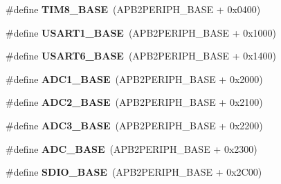 \begin{DoxyCompactItemize}
\item 
\hypertarget{group___peripheral__memory__map_ga5b72f698b7a048a6f9fcfe2efe5bc1db}{\#define {\bfseries T\-I\-M8\-\_\-\-B\-A\-S\-E}~(A\-P\-B2\-P\-E\-R\-I\-P\-H\-\_\-\-B\-A\-S\-E + 0x0400)}\label{group___peripheral__memory__map_ga5b72f698b7a048a6f9fcfe2efe5bc1db}

\item 
\hypertarget{group___peripheral__memory__map_ga86162ab3f740db9026c1320d46938b4d}{\#define {\bfseries U\-S\-A\-R\-T1\-\_\-\-B\-A\-S\-E}~(A\-P\-B2\-P\-E\-R\-I\-P\-H\-\_\-\-B\-A\-S\-E + 0x1000)}\label{group___peripheral__memory__map_ga86162ab3f740db9026c1320d46938b4d}

\item 
\hypertarget{group___peripheral__memory__map_gade4d3907fd0387ee832f426f52d568bb}{\#define {\bfseries U\-S\-A\-R\-T6\-\_\-\-B\-A\-S\-E}~(A\-P\-B2\-P\-E\-R\-I\-P\-H\-\_\-\-B\-A\-S\-E + 0x1400)}\label{group___peripheral__memory__map_gade4d3907fd0387ee832f426f52d568bb}

\item 
\hypertarget{group___peripheral__memory__map_ga695c9a2f892363a1c942405c8d351b91}{\#define {\bfseries A\-D\-C1\-\_\-\-B\-A\-S\-E}~(A\-P\-B2\-P\-E\-R\-I\-P\-H\-\_\-\-B\-A\-S\-E + 0x2000)}\label{group___peripheral__memory__map_ga695c9a2f892363a1c942405c8d351b91}

\item 
\hypertarget{group___peripheral__memory__map_ga6544abc57f9759f610eee09a02442ae6}{\#define {\bfseries A\-D\-C2\-\_\-\-B\-A\-S\-E}~(A\-P\-B2\-P\-E\-R\-I\-P\-H\-\_\-\-B\-A\-S\-E + 0x2100)}\label{group___peripheral__memory__map_ga6544abc57f9759f610eee09a02442ae6}

\item 
\hypertarget{group___peripheral__memory__map_gaca766f86c8e0b00a8e2b0224dcbb4c82}{\#define {\bfseries A\-D\-C3\-\_\-\-B\-A\-S\-E}~(A\-P\-B2\-P\-E\-R\-I\-P\-H\-\_\-\-B\-A\-S\-E + 0x2200)}\label{group___peripheral__memory__map_gaca766f86c8e0b00a8e2b0224dcbb4c82}

\item 
\hypertarget{group___peripheral__memory__map_gad06cb9e5985bd216a376f26f22303cd6}{\#define {\bfseries A\-D\-C\-\_\-\-B\-A\-S\-E}~(A\-P\-B2\-P\-E\-R\-I\-P\-H\-\_\-\-B\-A\-S\-E + 0x2300)}\label{group___peripheral__memory__map_gad06cb9e5985bd216a376f26f22303cd6}

\item 
\hypertarget{group___peripheral__memory__map_ga95dd0abbc6767893b4b02935fa846f52}{\#define {\bfseries S\-D\-I\-O\-\_\-\-B\-A\-S\-E}~(A\-P\-B2\-P\-E\-R\-I\-P\-H\-\_\-\-B\-A\-S\-E + 0x2\-C00)}\label{group___peripheral__memory__map_ga95dd0abbc6767893b4b02935fa846f52}


\end{DoxyCompactItemize}
